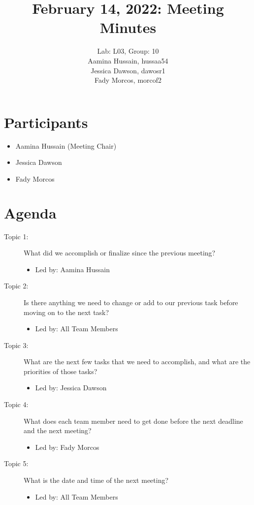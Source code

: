 \documentclass{article}
\title{February 14, 2022: Meeting Minutes}
\author{Lab: L03, Group: 10\\ Aamina Hussain, hussaa54\\ Jessica Dawson, dawosr1\\ Fady Morcos, morcof2}
\date{}
\begin{document}
\maketitle

\section{Participants}

\begin{itemize}
    \item Aamina Hussain (Meeting Chair)
    \item Jessica Dawson
    \item Fady Morcos
\end{itemize}


\section{Agenda}

\begin{description}
    \item [Topic 1:] What did we accomplish or finalize since the previous meeting?
    \begin{itemize}
        \item Led by: Aamina Hussain
    \end{itemize}
    \item [Topic 2:] Is there anything we need to change or add to our previous task before moving on to the next task?
    \begin{itemize}
        \item Led by: All Team Members
    \end{itemize}
    \item [Topic 3:] What are the next few tasks that we need to accomplish, and what are the priorities of those tasks?
    \begin{itemize}
        \item Led by: Jessica Dawson
    \end{itemize}
    \item [Topic 4:] What does each team member need to get done before the next deadline and the next meeting?
    \begin{itemize}
        \item Led by: Fady Morcos
    \end{itemize}
    \item [Topic 5:] What is the date and time of the next meeting?
    \begin{itemize}
        \item Led by: All Team Members
    \end{itemize}
\end{description}
\end{document}
